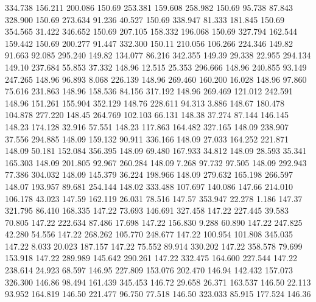  334.738  156.211  200.086       150.69
 253.381  159.608  258.982       150.69
  95.738   87.843  328.900       150.69
 273.634   91.236   40.527       150.69
 338.947   81.333  181.845       150.69
 354.565   31.422  346.652       150.69
 207.105  158.332  196.068       150.69
 327.794  162.544  159.442       150.69
 200.277   91.447  332.300       150.11
 210.056  106.266  224.346       149.82
  91.663   92.085  295.240       149.82
 134.077   86.216  342.355       149.39
  29.338   22.955  294.134       149.10
 237.684   55.853   37.332       148.96
  12.515   25.353  296.666       148.96
 240.855   93.149  247.265       148.96
  96.893    8.068  226.139       148.96
 269.460  160.200   16.028       148.96
  97.860   75.616  231.863       148.96
 158.536   84.156  317.192       148.96
 269.469  121.012  242.591       148.96
 151.261  155.904  352.129       148.76
 228.611   94.313    3.886       148.67
 180.478  104.878  277.220       148.45
 264.769  102.103   66.131       148.38
  37.274   87.144  146.145       148.23
 174.128   32.916   57.551       148.23
 117.863  164.482  327.165       148.09
 238.907   37.556  294.885       148.09
 159.132   90.911  336.166       148.09
  27.033  164.252  221.871       148.09
  50.181  152.084  356.395       148.09
  69.480  167.933   34.812       148.09
  28.593   35.341  165.303       148.09
 201.805   92.967  260.284       148.09
   7.268   97.732   97.505       148.09
 292.943   77.386  304.032       148.09
 145.379   36.224  198.966       148.09
 279.632  165.198  266.597       148.07
 193.957   89.681  254.144       148.02
 333.488  107.697  140.086       147.66
 214.010  106.178   43.023       147.59
 162.119   26.031   78.516       147.57
 353.947   22.278    1.186       147.37
 321.795   86.410  168.335       147.22
  73.693  146.691  327.458       147.22
 227.445   39.583   70.805       147.22
 222.634   87.486   17.698       147.22
 156.830    9.288   60.890       147.22
 247.825   42.280   54.556       147.22
 268.262  105.770  248.677       147.22
 100.954  101.808  345.035       147.22
   8.033   20.023  187.157       147.22
  75.552   89.914  330.202       147.22
 358.578   79.699  153.918       147.22
 289.989  145.642  290.261       147.22
 332.475  164.600  227.544       147.22
 238.614   24.923   68.597       146.95
 227.809  153.076  202.470       146.94
 142.432  157.073  326.300       146.86
  98.494  161.439  345.453       146.72
  29.658   26.371  163.537       146.50
  22.113   93.952  164.819       146.50
 221.477   96.750   77.518       146.50
 323.033   85.915  177.524       146.36
